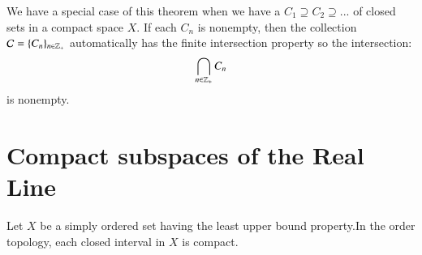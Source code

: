 \documentclass[12pt, a4paper, oneside, openright, titlepage]{book}
\begin{document}
We have a special case of this theorem when we have a  $C_1 \supseteq C_2 \supseteq ...$ of closed sets in a compact space $X$. If each $C_n$ is nonempty, then the collection $\mathcal{C} = \{C_n\}_{n\in \mathbb Z_+}$ automatically has the finite intersection property so the intersection: \begin{equation*}
    \bigcap\limits_{n\in\mathbb Z_+}C_n
\end{equation*}
is nonempty.

\section{Compact subspaces of the Real Line}

\begin{theorem}
    Let $X$ be a simply ordered set having the least upper bound property.In the order topology, each closed interval in $X$ is compact.
\end{theorem}
\end{document}
